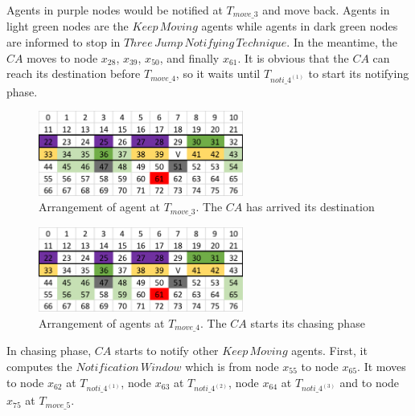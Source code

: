Agents in purple nodes would be notified at $T_{move\_3}$ and move back. Agents in light green nodes are the $Keep\,Moving$ agents while agents in dark green nodes are informed to stop in $Three\,Jump\,Notifying\,Technique$. In the meantime, the $CA$ moves to node $x_{28}$, $x_{39}$, $x_{50}$, and finally $x_{61}$. It is obvious that the $CA$ can reach its destination before $T_{move\_4}$, so it waits until $T_{noti\_{4^{(1)}}}$ to start its notifying phase. 

\begin{figure}[H]
  \centering  
  \includegraphics[width=0.6\textwidth]{figures/T611.png}
  \caption{Arrangement of agent at $T_{move\_3}$. The $CA$ has arrived its destination}\label{fig:T611}
\end{figure}

\begin{figure}[H]
  \centering  
  \includegraphics[width=0.6\textwidth]{figures/T612.png}
  \caption{Arrangement of agents at $T_{move\_4}$. The $CA$ starts its chasing phase}\label{fig:T612}
\end{figure}

In chasing phase, $CA$ starts to notify other $Keep\,Moving$ agents. First, it computes the $Notification\,Window$ which is from node $x_{55}$ to node $x_{65}$. It moves to node $x_{62}$ at $T_{noti\_4^{(1)}}$, node $x_{63}$ at $T_{noti\_4^{(2)}}$, node $x_{64}$ at $T_{noti\_4^{(3)}}$ and to node $x_{75}$ at $T_{move\_5}$. 

